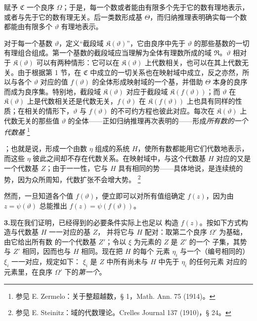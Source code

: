 \documentclass[11pt]{article}
\providecommand{\qtext}[1]{“#1”}
\providecommand{\Cfield}{\mathfrak C}
\providecommand{\Kfield}{\mathfrak K}
\providecommand{\Rfield}{\mathfrak R}
\providecommand{\srcfn}[2]{%
  \begingroup\renewcommand{\thefootnote}{#1}\footnote{#2}\addtocounter{footnote}{-1}\endgroup}
\begin{document}
赋予 \(\Cfield\) 一个良序 \(\Omega\)；于是，每一个数或者能由有限多个先于它的数有理地表示，或者与先于它的数有理无关。后一类数形成基 \(\Theta\)，而归纳推理表明确实每一个数都能由有限多个 \(\vartheta\) 有理地表示。

对于每一个基数 \(\vartheta\)，定义\qtext{截段域 \(\Kfield(\vartheta)\)}，它由良序中先于 \(\vartheta\) 的那些基数的一切有理组合组成。第一个基数的截段域应当理解为全体有理数所成的域 \(\Rfield\)。\(\vartheta\) 相对于 \(\Kfield(\vartheta)\) 可以有两种情形：它可以在 \(\Kfield(\vartheta)\) 上代数相关，也可以在其上代数无关。由于根据第 1 节，在 \(\Cfield\) 中成立的一切关系也在映射域中成立，反之亦然，所以与各个 \(\vartheta\) 对应的值 \(f(\vartheta)\) 的全体形成映射域的一个基，并借助 \(\Theta\) 本身的良序而成为良序集。特别地，截段域 \(\Kfield(\vartheta)\) 对应于截段域 \(\Kfield(f(\vartheta))\)；而 \(\vartheta\) 在 \(\Kfield(\vartheta)\) 上是代数相关还是代数无关，\(f(\vartheta)\) 在 \(\Kfield(f(\vartheta))\) 上也具有同样的性质；在相关的情形下，\(\vartheta\) 与 \(f(\vartheta)\) 的不可约方程也彼此对应。每次在 \(\Kfield(\vartheta)\) 上代数无关的那些值 \(\vartheta\) 的全体——正如归纳推理再次表明的——形成\emph{所有数的一个代数基}\srcfn{*)}{参见 E. Zermelo：关于整超越数，§ 1，Math. Ann. 75 (1914)。}；也就是说，形成一个由数 \(\eta\) 组成的系统 \(H\)，使所有数都能用它们代数地表示，而这些 \(\eta\) 彼此之间却不存在代数关系。在映射域中，与这个代数基 \(H\) 对应的又是一个代数基 \(Z\)；由于一一性，它与 \(H\) 具有相同的势——具体地说，是连续统的势，因为众所周知，代数扩张不会增大势。\srcfn{**)}{参见 E. Steinitz：域的代数理论。Crelles Journal 137 (1910)，§ 24。}然而，一旦知道各个值 \(f(\vartheta)\)，便立即可以对所有值组确定 \(f(z)\)，因为由 \(z=\psi(\vartheta)\) 总能推出 \(f(z)=\psi(f(\vartheta))\)。

\medskip
\noindent\textbf{3.}\quad 现在我们证明，已经得到的必要条件实际上也足以
构造 \(f(z)\)。按如下方式构造与代数基 \(H\) 一一对应的基 \(Z\)，
并将它与 \(H\) 配对：取第二个良序 \(\Omega'\) 为基础，由它给出所有数
的一个代数基 \(Z'\)；令以 \(\xi\) 为元素的 \(Z\) 是 \(Z'\) 的一个
子集，其势与 \(Z'\) 相同，因而也与 \(H\) 相同。现在把 \(H\) 的每个
元素 \(\eta_i\) 与一个（编号相同的）\(\xi_i\) 一一对应，规定如下：
\(\xi_i\) 是 \(Z\) 中所有尚未与 \(H\) 中先于 \(\eta_i\) 的任何元素
对应的元素里，在良序 \(\Omega'\) 下的\emph{第一个}。
\end{document}
